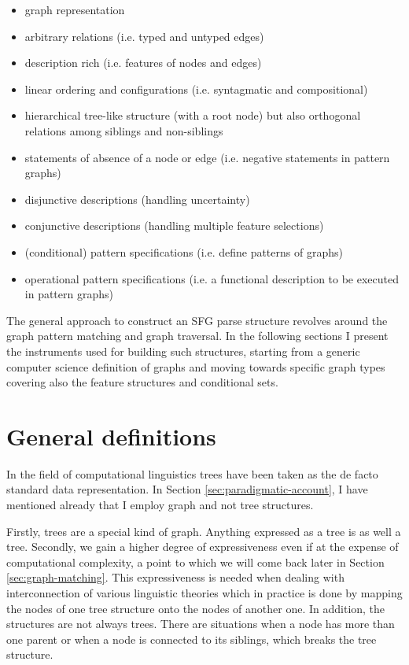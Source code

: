     \begin{itemize}
    	\item graph representation 
        \item arbitrary relations (i.e. typed and untyped edges)
    	\item description rich (i.e. features of nodes and edges)
    	\item linear ordering and configurations (i.e. syntagmatic and compositional)
    	\item hierarchical tree-like structure (with a root node) but also orthogonal relations among siblings and non-siblings
    	\item statements of absence of a node or edge (i.e. negative statements in pattern graphs)
    	\item disjunctive descriptions (handling uncertainty)
    	\item conjunctive descriptions (handling multiple feature selections)
    	\item (conditional) pattern specifications (i.e. define patterns of graphs)
    	\item operational pattern specifications (i.e. a functional description to be executed in pattern graphs)
    \end{itemize}

    The general approach to construct an SFG parse structure revolves around the graph pattern matching and graph traversal. In the following sections I present the instruments used for building such structures, starting from a generic computer science definition of graphs and moving towards specific graph types covering also the feature structures and conditional sets. 

\section{General definitions}
\label{sec:graphs}

    In the field of computational linguistics trees have been taken as the de facto standard data representation. In Section \ref{sec:paradigmatic-account}, I have mentioned already that I employ graph and not tree structures. 

    Firstly, trees are a special kind of graph. Anything expressed as a tree is as well a tree. Secondly, we gain a higher degree of expressiveness even if at the expense of computational complexity, a point to which we will come back later in Section \ref{sec:graph-matching}. This expressiveness is needed when dealing with interconnection of various linguistic theories which in practice is done by mapping the nodes of one tree structure onto the nodes of another one. In addition, the structures are not always trees. There are situations when a node has more than one parent or when a node is connected to its siblings, which breaks the tree structure. 

